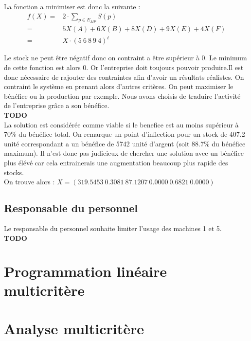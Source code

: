 \documentclass[a4paper, 11pt]{article}
\begin{document}
La fonction a minimiser est donc la suivante : \\
$$
\begin{array}{rl}
    f(X) = & 2\cdot \sum_{p\in E_{MP}} S(p) \\
         = & 5 X(A) + 6 X(B) + 8 X(D) + 9 X(E) + 4 X(F) \\
         = & X\cdot(5~6~8~9~4)^t
\end{array}
$$

Le stock ne peut être négatif donc on contraint a être supérieur à 0. Le
minimum de cette fonction est alors 0. Or l'entreprise doit toujours pouvoir
produire.Il est donc nécessaire de rajouter des contraintes afin d'avoir un
résultats réalistes. On contraint le système en prenant alors d'autres
critères. On peut maximiser le bénéfice ou la production par exemple. Nous
avons choisis de traduire l’activité de l’entreprise grâce a son bénéfice. \\

\textbf{TODO} \\

La solution est considérée comme viable si le benefice est au moins supérieur à
70\% du bénéfice total. On remarque un point d’inflection pour un stock de
407.2 unité correspondant a un bénéfice de 5742 unité d’argent (soit 88.7\% du
bénéfice maximum). Il n’est donc pas judicieux de chercher une solution avec
un bénéfice plus élévé car cela entrainerais une augmentation beaucoup plus
rapide des stocks. \\

On trouve alors : $ X = (319.5453 ~0.3081 ~87.1207 ~0.0000 ~0.6821 ~0.0000) $

\subsection{Responsable du personnel}
Le responsable du personnel souhaite limiter l'usage des machines 1 et 5.
\\ \textbf{TODO} \\

\section{Programmation linéaire multicritère}

\section{Analyse multicritère}
\end{document}

